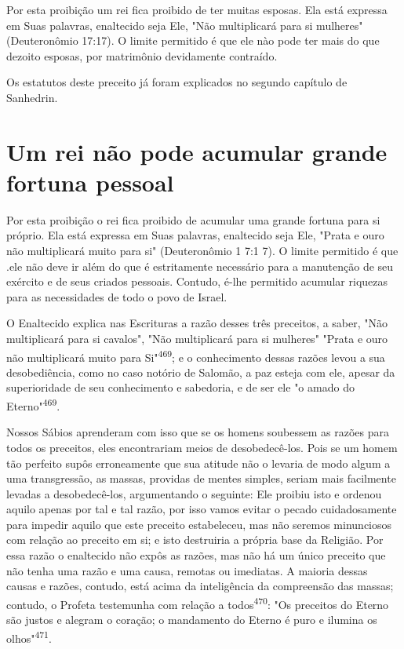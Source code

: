 \begin{itemize}
\begin{enumrate}
\begin{itemize}
\begin{itemize}
\begin{itemize}
Por esta proibição um rei fica proibido de ter muitas esposas. Ela es­tá
expressa em Suas palavras, enaltecido seja Ele, "Não multiplicará para
si mu­lheres" (Deuteronômio 17:17). O limite permitido é que ele nào
pode ter mais do que dezoito esposas, por matrimônio devidamente
contraído.

Os estatutos deste preceito já foram explicados no segundo capítulo de
Sanhedrin.

\section{Um rei não pode acumular grande fortuna pessoal}

Por esta proibição o rei fica proibido de acumular uma grande fortu­na
para si próprio. Ela está expressa em Suas palavras, enaltecido seja
Ele, "Pra­ta e ouro não multiplicará muito para si" (Deuteronômio 1 7:1
7). O limite per­mitido é que .ele não deve ir além do
que é estritamente necessário para a ma­nutenção de seu exército e de
seus criados pessoais. Contudo, é-lhe permitido acumular riquezas para
as necessidades de todo o povo de Israel.

O Enaltecido explica nas Escrituras a razão desses três preceitos, a
saber, "Não multiplicará para si cavalos", "Não multiplicará para si
mulheres"
 "Prata e ouro não multiplicará muito para Si"\textsuperscript{469}; e
 o conhecimento dessas razões levou a sua desobediência, como no caso
 notório de Salomão, a paz es­teja com ele, apesar da superioridade de
 seu conhecimento e sabedoria, e de ser ele "o amado do
 Eterno"\textsuperscript{469}.


Nossos Sábios aprenderam com isso que se os homens soubessem as razões
para todos os preceitos, eles encontrariam meios de desobedecê-los. Pois
se um homem tão perfeito supôs erroneamente que sua atitude não o
leva­ria de modo algum a uma transgressão, as massas, providas de mentes
simples, seriam mais facilmente levadas a desobedecê-los, argumentando o
seguinte: Ele proibiu isto e ordenou aquilo apenas por tal e tal razão,
por isso vamos evitar o pecado cuidadosamente para impedir aquilo que
este preceito estabeleceu, mas não seremos minunciosos com relação ao
preceito em si; e isto destruiria a própria base da Religião. Por essa
razão o enaltecido não expôs as razões, mas não há um único preceito que
não tenha uma razão e uma causa, remotas ou imediatas. A maioria dessas
causas e razões, contudo, está acima da inteligência
 da compreensão das massas; contudo, o Profeta testemunha com relação a
 todos\textsuperscript{470}: "Os preceitos do Eterno são justos e
 alegram o coração; o manda­mento do Eterno é puro e ilumina os
 olhos"\textsuperscript{471}.


\end{itemize}
\end{itemize}
\end{itemize}
\end{enumrate}
\end{itemize}
